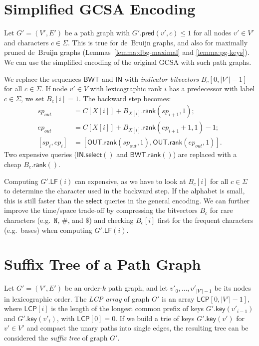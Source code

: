 \documentclass[twoside,leqno,twocolumn]{article}
\newcommand{\abs}[1]{\ensuremath{\lvert #1 \rvert}}
\newcommand{\baseN}{\mathtt{N}}
\newcommand{\rank}{\ensuremath{\mathsf{rank}}}
\newcommand{\select}{\ensuremath{\mathsf{select}}}
\newcommand{\LF}{\ensuremath{\mathsf{LF}}}
\newcommand{\gpred}{\ensuremath{\mathsf{pred}}}
\newcommand{\gkey}{\ensuremath{\mathsf{key}}}
\newcommand{\orderk}[1]{order\nobreakdash-$#1$}
\newcommand{\BWT}{\ensuremath{\mathsf{BWT}}}
\newcommand{\LCP}{\ensuremath{\mathsf{LCP}}}
\newcommand{\bvIN}{\ensuremath{\mathsf{IN}}}
\newcommand{\bvOUT}{\ensuremath{\mathsf{OUT}}}
\begin{document}
\section{Simplified GCSA Encoding}\label{appendix:encoding}

Let $G' = (V', E')$ be a path graph with $G'.\gpred(v', c) \le 1$ for all nodes $v' \in V'$ and characters $c \in \Sigma$. This is true for de~Bruijn graphs, and also for maximally pruned de~Bruijn graphs (Lemmas~\ref{lemma:dbg-maximal} and \ref{lemma:pg-keys}). We can use the simplified encoding of the original GCSA \cite{Siren2014} with such path graphs.

We replace the sequences $\BWT$ and $\bvIN$ with \emph{indicator bitvectors} $B_{c}[0, \abs{V'}-1]$ for all $c \in \Sigma$. If node $v' \in V$ with lexicographic rank $i$ has a predecessor with label $c \in \Sigma$, we set $B_{c}[i] = 1$. The backward step becomes:
\begin{align*}
sp_{out} & = C[X[i]] + B_{X[i]}.\rank(sp_{i+1}, 1); \\
ep_{out} & = C[X[i]] + B_{X[i]}.\rank(ep_{i+1}+1, 1) - 1; \\
[sp_{i}, ep_{i}] & = [\bvOUT.\rank(sp_{out}, 1), \bvOUT.\rank(ep_{out}, 1)].
\end{align*}
Two expensive queries ($\bvIN.\select()$ and $\BWT.\rank()$) are replaced with a cheap $B_{c}.\rank()$.

Computing $G'.\LF(i)$ can expensive, as we have to look at $B_{c}[i]$ for all $c \in \Sigma$ to determine the character used in the backward step. If the alphabet is small, this is still faster than the $\select$ queries in the general encoding. We can further improve the time/space trade-off by compressing the bitvectors $B_{c}$ for rare characters (e.g.~$\baseN$, $\#$, and $\$$) and checking $B_{c}[i]$ first for the frequent characters (e.g.~bases) when computing $G'.\LF(i)$.


\section{Suffix Tree of a Path Graph}\label{appendix:extensions}

Let $G' = (V', E')$ be an \orderk{k} path graph, and let $v'_{0}, \dotsc, v'_{\abs{V'}-1}$ be its nodes in lexicographic order. The \emph{LCP array} of graph $G'$ is an array $\LCP[0, \abs{V'}-1]$, where $\LCP[i]$ is the length of the longest common prefix of keys $G'.\gkey(v'_{i-1})$ and $G'.\gkey(v'_{i})$, with $\LCP[0] = 0$. If we build a trie of keys $G'.\gkey(v')$ for $v' \in V'$ and compact the unary paths into single edges, the resulting tree can be considered the \emph{suffix tree} of graph $G'$.
\end{document}
